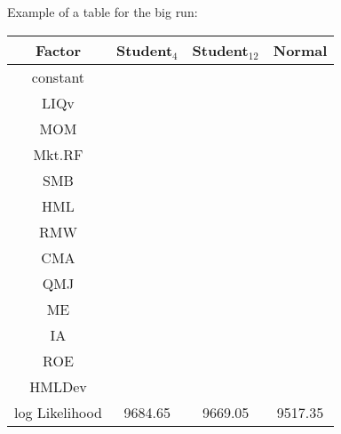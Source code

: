 \documentclass[12pt]{article}
\begin{document}
Example of a table for the big run:
\begin{table}[ht]
	\centering
	\begin{tabular}{cccc}
		Factor & Student$_{4}$ & Student$_{12}$ & Normal \\ 
		\hline
		constant &  &  &  \\ 
		LIQv &  &  &  \\ 
		MOM & \checkmark & \checkmark & \checkmark \\ 
		Mkt.RF & \checkmark & \checkmark & \checkmark \\ 
		SMB &  &  & \checkmark \\ 
		HML & \checkmark & \checkmark & \checkmark \\ 
		RMW & \checkmark & \checkmark & \checkmark \\ 
		CMA & \checkmark & \checkmark & \checkmark \\ 
		QMJ & \checkmark & \checkmark & \checkmark \\ 
		ME & \checkmark & \checkmark & \checkmark \\ 
		IA &  &  &  \\ 
		ROE & \checkmark & \checkmark & \checkmark \\ 
		HMLDev &  &  & \checkmark \\ 
		\hline
		log Likelihood & 9684.65 & 9669.05 & 9517.35 \\ 
	\end{tabular}
\end{table}
\end{document}
